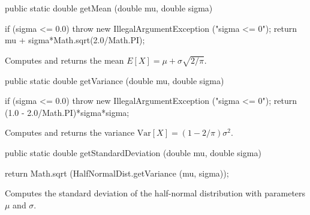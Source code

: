 \begin{htmlonly}
\end{htmlonly}
\begin{code}

   public static double getMean (double mu, double sigma)\begin{hide} {
      if (sigma <= 0.0)
         throw new IllegalArgumentException ("sigma <= 0");
      return mu + sigma*Math.sqrt(2.0/Math.PI);
   }\end{hide}
\end{code}
\begin{tabb}  Computes and returns the mean
$
E[X] = \mu + \sigma \sqrt{2 / \pi}.
$
\end{tabb}
\begin{htmlonly}
\end{htmlonly}
\begin{code}

   public static double getVariance (double mu, double sigma)\begin{hide} {
      if (sigma <= 0.0)
         throw new IllegalArgumentException ("sigma <= 0");
      return (1.0 - 2.0/Math.PI)*sigma*sigma;
   }\end{hide}
\end{code}
\begin{tabb}  Computes and returns the variance
$
\mbox{Var}[X] = \left(1-2/\pi\right)\sigma^2.
$
\end{tabb}
\begin{htmlonly}
\end{htmlonly}
\begin{code}

   public static double getStandardDeviation (double mu, double sigma) \begin{hide} {
      return Math.sqrt (HalfNormalDist.getVariance (mu, sigma));
   }\end{hide}
\end{code}
\begin{tabb} Computes the standard deviation of the half-normal distribution with
   parameters $\mu$ and $\sigma$.
\end{tabb}
